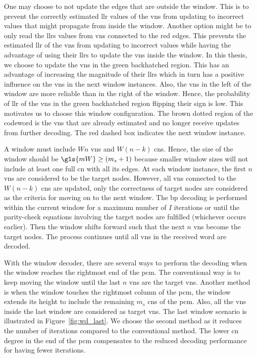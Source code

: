 One may choose to not update the edges that are outside the window. This is to prevent the correctly estimated \gls{llr} values of the \glspl{vn} from updating to incorrect values that might propagate from inside the window. Another option might be to only read the \glspl{llr} values from \glspl{vn} connected to the red edges. This prevents the estimated \gls{llr} of the \glspl{vn} from updating to incorrect values while having the advantage of using their \glspl{llr} to update the \glspl{vn} inside the window. In this thesis, we choose to update the \glspl{vn} in the green backhatched region. This has an advantage of increasing the magnitude of their \glspl{llr} which in turn has a positive influence on the \glspl{vn} in the next window instances. Also, the \glspl{vn} in the left of the window are more reliable than in the right of the window. Hence, the probability of \gls{llr} of  the \glspl{vn} in the green backhatched region flipping their sign is low. This motivates us to choose this window configuration. The brown dotted region of the codeword is the \glspl{vn} that are already estimated and no longer receive updates from further decoding. The red dashed box indicates the next window instance. 

A window must include $Wn$ \glspl{vn} and $W(n-k)$ \glspl{cn}. Hence, the size of the window should be $\gls{mW}\geq (m_s+1)$ because smaller window sizes will not include at least one full \gls{cn} with all its edges. At each window instance, the first $n$ \glspl{vn} are considered to be the target nodes. However, all \glspl{vn} connected to the $W(n-k)$ \glspl{cn} are updated, only the correctness of target nodes are considered as the criteria for moving on to the next window. The \gls{bp} decoding is performed within the current window for a maximum number of $I$ iterations or until the parity-check equations involving the target nodes are fulfilled (whichever occurs earlier). Then the window shifts forward such that the next $n$ \glspl{vn} become the target nodes. The process continues until all \glspl{vn} in the received word are decoded.

With the window decoder, there are several ways to perform the decoding when the window reaches the rightmost end of the \gls{pcm}. The conventional way is to keep moving the window until the last $n$ \glspl{vn} are the target \glspl{vn}. Another method is when the window touches the rightmost column of the \gls{pcm}, the window extends its height to include the remaining $m_s$ \glspl{cn} of the \gls{pcm}. Also, all the \glspl{vn} inside the last window are considered as target \glspl{vn}. The last window scenario is illustrated in Figure~\ref{fig:wd_last}. We choose the second method as it reduces the number of iterations compared to the conventional method. The lower \gls{cn} degree in the end of the \gls{pcm} compensates to the reduced decoding performance for having fewer iterations.


